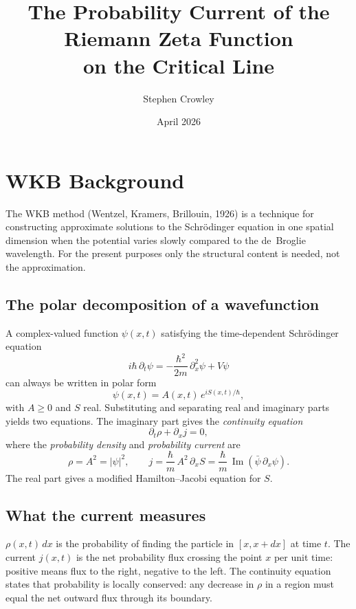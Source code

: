 \documentclass[11pt]{article}
\title{The Probability Current of the Riemann Zeta Function\\
on the Critical Line}
\author{Stephen Crowley}
\date{April 2026}
\theoremstyle{plain}
\theoremstyle{definition}
\theoremstyle{remark}
\DeclareMathOperator{\im}{Im}
\begin{document}
\maketitle

\section{WKB Background}

The WKB method (Wentzel, Kramers, Brillouin, 1926) is a technique
for constructing approximate solutions to the Schr\"odinger equation
in one spatial dimension when the potential varies slowly compared
to the de~Broglie wavelength. For the present purposes only the
structural content is needed, not the approximation.

\subsection*{The polar decomposition of a wavefunction}

A complex-valued function $\psi(x,t)$ satisfying the time-dependent
Schr\"odinger equation
\[
i\hbar\,\partial_t\psi = -\frac{\hbar^2}{2m}\,\partial_x^2\psi + V\psi
\]
can always be written in polar form
\[
\psi(x,t) = A(x,t)\,e^{iS(x,t)/\hbar},
\]
with $A \geq 0$ and $S$ real. Substituting and separating real and
imaginary parts yields two equations. The imaginary part gives the
\emph{continuity equation}
\[
\partial_t\rho + \partial_x j = 0,
\]
where the \emph{probability density} and \emph{probability current}
are
\[
\rho = A^2 = |\psi|^2,
\qquad
j = \frac{\hbar}{m}\,A^2\,\partial_x S
  = \frac{\hbar}{m}\,\im\!\left(\bar\psi\,\partial_x\psi\right).
\]
The real part gives a modified Hamilton--Jacobi equation for $S$.

\subsection*{What the current measures}

$\rho(x,t)\,dx$ is the probability of finding the particle in $[x,
x+dx]$ at time $t$. The current $j(x,t)$ is the net probability flux
crossing the point $x$ per unit time: positive means flux to the
right, negative to the left. The continuity equation states that
probability is locally conserved: any decrease in $\rho$ in a region
must equal the net outward flux through its boundary.
\end{document}
